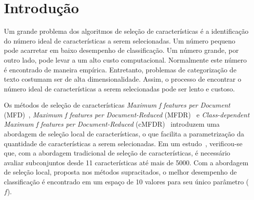 \documentclass[conference]{IEEEtran}
\begin{document}

\section{Introdução}
\label{sec:intro}

Um grande problema dos algoritmos de seleção de características é a identificação do número ideal de características a serem selecionadas. Um número pequeno pode acarretar em baixo desempenho de classificação. Um número grande, por outro lado, pode levar a um alto custo computacional. Normalmente este número é encontrado de maneira empírica. Entretanto, problemas de categorização de texto costumam ser de alta dimensionalidade. Assim, o processo de encontrar o número ideal de características a serem selecionadas pode ser lento e custoso.

Os métodos de seleção de características \textit{Maximum f features per Document} (MFD)~\cite{mfd2014}, \textit{Maximum f features per Document-Reduced} (MFDR)~\cite{mfd2014} e \textit{Class-dependent Maximum f features per Document-Reduced} (cMFDR)~\cite{fragoso2016cmfdr} introduzem uma abordagem de seleção local de características, o que facilita a parametrização da quantidade de características a serem selecionadas. Em um estudo~\cite{mfd2014}, verificou-se que, com a abordagem tradicional de seleção de características, é necessário avaliar subconjuntos desde 11 características até mais de 5000. Com a abordagem de seleção local, proposta nos métodos supracitados, o melhor desempenho de classificação é encontrado em um espaço de 10 valores para seu único parâmetro ($f$). 
\end{document}

